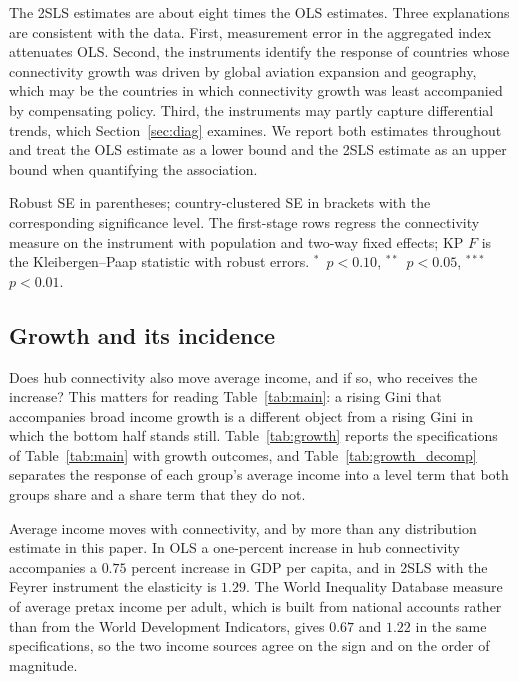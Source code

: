 \documentclass[12pt]{article}
\newcommand{\sym}[1]{\ensuremath{^{#1}}}
\begin{document}
The 2SLS estimates are about eight times the OLS estimates. Three explanations are consistent with the data. First, measurement error in the aggregated index attenuates OLS. Second, the instruments identify the response of countries whose connectivity growth was driven by global aviation expansion and geography, which may be the countries in which connectivity growth was least accompanied by compensating policy. Third, the instruments may partly capture differential trends, which Section~\ref{sec:diag} examines. We report both estimates throughout and treat the OLS estimate as a lower bound and the 2SLS estimate as an upper bound when quantifying the association.

\begin{table}[H]\centering\caption{Main results: OLS, first stage, and 2SLS, by connectivity measure.}\label{tab:main}
\begin{threeparttable}\small
\begin{tablenotes}\footnotesize\item Robust SE in parentheses; country-clustered SE in brackets with the corresponding significance level. The first-stage rows regress the connectivity measure on the instrument with population and two-way fixed effects; KP $F$ is the Kleibergen--Paap statistic with robust errors. \sym{*}~$p<0.10$, \sym{**}~$p<0.05$, \sym{***}~$p<0.01$.\end{tablenotes}\end{threeparttable}\end{table}

\subsection{Growth and its incidence}
\label{sec:growth}
Does hub connectivity also move average income, and if so, who receives the increase? This matters for reading Table~\ref{tab:main}: a rising Gini that accompanies broad income growth is a different object from a rising Gini in which the bottom half stands still. Table~\ref{tab:growth} reports the specifications of Table~\ref{tab:main} with growth outcomes, and Table~\ref{tab:growth_decomp} separates the response of each group's average income into a level term that both groups share and a share term that they do not.

Average income moves with connectivity, and by more than any distribution estimate in this paper. In OLS a one-percent increase in hub connectivity accompanies a $0.75$ percent increase in GDP per capita, and in 2SLS with the Feyrer instrument the elasticity is $1.29$. The World Inequality Database measure of average pretax income per adult, which is built from national accounts rather than from the World Development Indicators, gives $0.67$ and $1.22$ in the same specifications, so the two income sources agree on the sign and on the order of magnitude.
\end{document}
